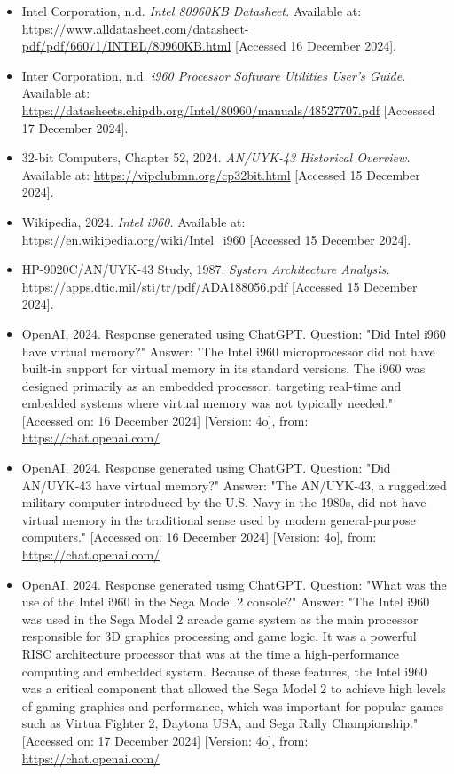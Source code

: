 \documentclass{article}
\begin{document}
\begin{itemize}
\item Intel Corporation, n.d. \textit{Intel 80960KB Datasheet.} Available at: \url{https://www.alldatasheet.com/datasheet-pdf/pdf/66071/INTEL/80960KB.html} [Accessed 16 December 2024].

\item Inter Corporation, n.d. \textit{i960 Processor Software Utilities
User’s Guide.} Available at: \url{https://datasheets.chipdb.org/Intel/80960/manuals/48527707.pdf} [Accessed 17 December 2024].


\item 32-bit Computers, Chapter 52, 2024. \textit{AN/UYK-43 Historical Overview.} Available at: \url{https://vipclubmn.org/cp32bit.html} [Accessed 15 December 2024].

\item Wikipedia, 2024. \textit{Intel i960.} Available at: \url{https://en.wikipedia.org/wiki/Intel_i960} [Accessed 15 December 2024].

\item HP-9020C/AN/UYK-43 Study, 1987. \textit{System Architecture Analysis.} \url{https://apps.dtic.mil/sti/tr/pdf/ADA188056.pdf} [Accessed 15 December 2024].

\item OpenAI, 2024. Response generated using ChatGPT. Question: "Did Intel i960 have virtual memory?" Answer: "The Intel i960 microprocessor did not have built-in support for virtual memory in its standard versions. The i960 was designed primarily as an embedded processor, targeting real-time and embedded systems where virtual memory was not typically needed." [Accessed on: 16 December 2024] [Version: 4o], from: \url{https://chat.openai.com/}

\item OpenAI, 2024. Response generated using ChatGPT. Question: "Did AN/UYK-43 have virtual memory?" Answer: "The AN/UYK-43, a ruggedized military computer introduced by the U.S. Navy in the 1980s, did not have virtual memory in the traditional sense used by modern general-purpose computers." [Accessed on: 16 December 2024] [Version: 4o], from: \url{https://chat.openai.com/}

\item OpenAI, 2024. Response generated using ChatGPT. Question: "What was the use of the Intel i960 in the Sega Model 2 console?" Answer: "The Intel i960 was used in the Sega Model 2 arcade game system as the main processor responsible for 3D graphics processing and game logic. It was a powerful RISC architecture processor that was at the time a high-performance computing and embedded system. Because of these features, the Intel i960 was a critical component that allowed the Sega Model 2 to achieve high levels of gaming graphics and performance, which was important for popular games such as Virtua Fighter 2, Daytona USA, and Sega Rally Championship." [Accessed on: 17 December 2024] [Version: 4o], from: \url{https://chat.openai.com/}


\end{itemize}
\end{document}
